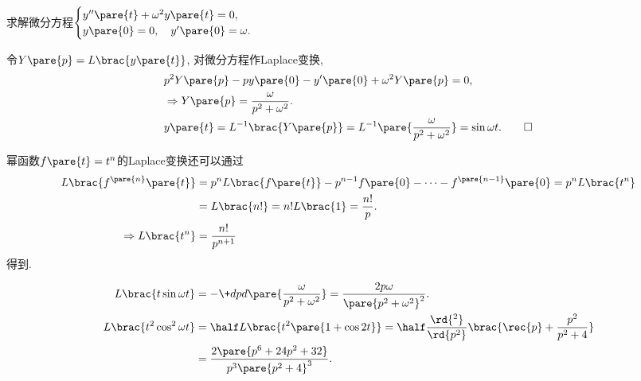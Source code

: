 \documentclass[../ComplexVariable.tex]{subfiles}
\begin{document}
\begin{sample}
    \begin{ex}
        求解微分方程$\displaystyle \begin{cases}
            y''\pare{t} + \omega^2 y\pare{t} = 0, \\
            y\pare{0} = 0,\quad y'\pare{0} = \omega.
        \end{cases}$
    \end{ex}
    \begin{solution}
        令$Y\pare{p} = L\brac{y\pare{t}}$, 对微分方程作Laplace变换,
        \begin{align*}
            & p^2Y\pare{p} - py\pare{0} - y'\pare{0} + \omega^2 Y\pare{p} = 0, \\
            &\Rightarrow Y\pare{p} = \frac{\omega}{p^2 + \omega^2}. \\
            &y\pare{t} = L^{-1}\brac{Y\pare{p}} = L^{-1}\pare{\frac{\omega}{p^2+\omega^2}} = \sin\omega t. \qedhere
        \end{align*}
    \end{solution}
\end{sample}
\begin{sample}
    \begin{ex}
        幂函数$f\pare{t} = t^n$的Laplace变换还可以通过
        \begin{align*}
            L\brac{f^{\pare{n}}\pare{t}} &= p^n L\brac{f\pare{t}} - p^{n-1}f\pare{0} - \cdots - f^{\pare{n-1}}\pare{0} = p^nL\brac{t^n}\\ &= L\brac{n!} = n!L\brac{1} = \frac{n!}{p}.\\
            \Rightarrow L\brac{t^n} &= \frac{n!}{p^{n+1}}
        \end{align*}
        得到.
    \end{ex}
\end{sample}
\begin{sample}
    \begin{ex}
        \begin{align*}
            L\brac{t\sin\omega t} &= -\+dpd{}\pare{\frac{\omega}{p^2+\omega^2}} = \frac{2p\omega}{\pare{p^2+\omega^2}^2}. \\
            L\brac{t^2\cos^2\omega t} &= \half L\brac{t^2 \pare{1+\cos 2t}} = \half \frac{\rd{^2}}{\rd{p^2}}\brac{\rec{p} + \frac{p^2}{p^2+4}} \\
            &= \frac{2\pare{p^6 + 24p^2 + 32}}{p^3 \pare{p^2+4}^3}.
        \end{align*}
    \end{ex}
\end{sample}
\end{document}
